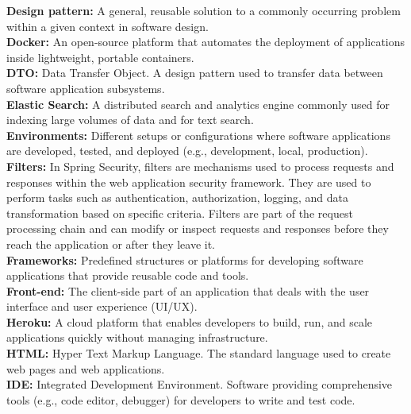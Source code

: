 \textbf{Design pattern:} A general, reusable solution to a commonly occurring problem within a given context in software design.\\

\textbf{Docker:} An open-source platform that automates the deployment of applications inside lightweight, portable containers.\\

\textbf{DTO:} Data Transfer Object. A design pattern used to transfer data between software application subsystems.\\

\textbf{Elastic Search:} A distributed search and analytics engine commonly used for indexing large volumes of data and for text search.\\

\textbf{Environments:} Different setups or configurations where software applications are developed, tested, and deployed (e.g., development, local, production).\\

\textbf{Filters:} In Spring Security, filters are mechanisms used to process requests and responses within the web application security framework. They are used to perform tasks such as authentication, authorization, logging, and data transformation based on specific criteria. Filters are part of the request processing chain and can modify or inspect requests and responses before they reach the application or after they leave it.\\

\textbf{Frameworks:} Predefined structures or platforms for developing software applications that provide reusable code and tools.\\

\textbf{Front-end:} The client-side part of an application that deals with the user interface and user experience (UI/UX).\\

\textbf{Heroku:} A cloud platform that enables developers to build, run, and scale applications quickly without managing infrastructure.\\

\textbf{HTML:} Hyper Text Markup Language. The standard language used to create web pages and web applications.\\

\textbf{IDE:} Integrated Development Environment. Software providing comprehensive tools (e.g., code editor, debugger) for developers to write and test code.\\

